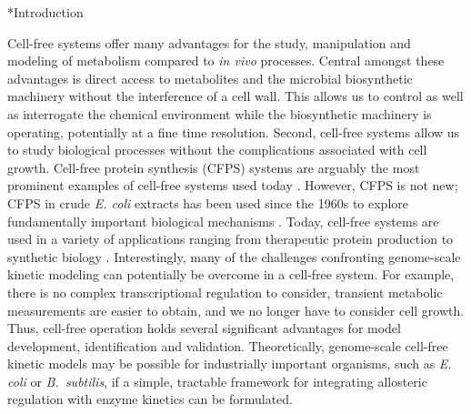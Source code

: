 \documentclass[12pt]{article}
\makeatletter
\renewcommand\section{\@startsection
	{subsection}{2}{0mm}
	{-0.2in}
	{0.05\baselineskip}
	{\normalfont\large\bfseries}}
\makeatother
\begin{document}
\linenumbers


\section*{Introduction}

Cell-free systems offer many advantages for the study, manipulation and modeling of metabolism compared to \textit{in vivo} processes.
Central amongst these advantages is direct access to metabolites and the microbial biosynthetic machinery without the interference of a cell wall.
This allows us to control as well as interrogate the chemical environment while the biosynthetic machinery is operating, potentially at a fine time resolution.
Second, cell-free systems allow us to study biological processes without the complications associated with cell growth.
Cell-free protein synthesis (CFPS) systems are arguably the most prominent examples of cell-free systems used today \citep{Jewett:2008aa}.
However, CFPS is not new; CFPS in crude \textit{E. coli} extracts has been used since the 1960s to explore fundamentally important biological mechanisms \citep{MATTHAEI:1961aa,NIRENBERG:1961aa}.
Today, cell-free systems are used in a variety of applications ranging from therapeutic protein production \citep{Lu:2014aa} to synthetic biology \citep{Hodgman:2012aa}.
Interestingly, many of the challenges confronting genome-scale kinetic modeling can potentially be overcome in a cell-free system.
For example, there is no complex transcriptional regulation to consider, transient metabolic measurements are easier to obtain, and we no longer have to consider cell growth.
Thus, cell-free operation holds several significant advantages for model development, identification and validation. Theoretically, genome-scale cell-free kinetic models may be possible for industrially important organisms,
such as \textit{E. coli} or \textit{B.~subtilis}, if a simple, tractable framework for integrating allosteric regulation with enzyme kinetics can be formulated.
\end{document}
